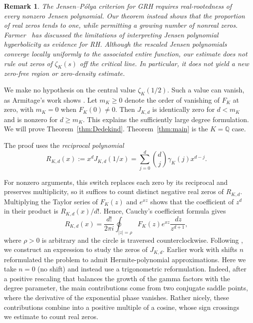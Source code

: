 \documentclass[11pt,reqno]{amsart}
\numberwithin{equation}{section}
\newtheorem{remark}[theorem]{Remark}
\newcommand{\dd}{\,d}
\begin{document}
\begin{remark}
    The Jensen--P\'olya criterion for GRH requires real-rootedness
of every nonzero Jensen polynomial. Our theorem instead
shows that the proportion of real zeros tends to one,
while permitting a growing number of nonreal zeros.
Farmer~\cite{Farmer2022} has discussed the limitations
of interpreting Jensen polynomial hyperbolicity as
evidence for RH. Although the rescaled Jensen
polynomials converge locally uniformly to the
associated entire function, our estimate does not
rule out zeros of $\zeta_K(s)$ off the critical line.
In particular, it does not yield a new zero-free region
or zero-density estimate.
\end{remark}

We make no hypothesis on the central value $\zeta_K(1/2)$.
Such a value can vanish, as Armitage's work shows
\cite{Armitage}. Let $m_K\ge0$ denote the order of vanishing of
$F_K$ at zero, with $m_K=0$ when $F_K(0)\ne0$. Then $J_{K,d}$
is identically zero for $d<m_K$ and is nonzero for
$d\ge m_K$. This explains the sufficiently large degree formulation.
We will prove Theorem~\ref{thm:Dedekind}. Theorem~\ref{thm:main} is the $K=\mathbb{Q}$ case.

The proof uses the \emph{reciprocal polynomial}
\begin{equation}\label{eq:reciprocal-definition}
 R_{K,d}(x):=x^dJ_{K,d}(1/x)
           =\sum_{j=0}^d\binom dj\gamma_K(j)x^{d-j}.
\end{equation}

For nonzero arguments, this switch replaces each zero by its
reciprocal and preserves multiplicity, so it suffices to count
distinct negative real zeros of $R_{K,d}$. Multiplying the Taylor
series of $F_K(z)$ and $e^{xz}$ shows that the coefficient of $z^d$
in their product is $R_{K,d}(x)/d!$. Hence, Cauchy's coefficient formula
gives
\[
 R_{K,d}(x)=\frac{d!}{2\pi i}
       \oint_{|z|=\rho}F_K(z)e^{xz}\frac{\dd z}{z^{d+1}},
\]
where $\rho>0$ is arbitrary and the circle is traversed
counterclockwise. Following \cite{GORZ, GORTTW, Wagner}, we construct an expression to study the zeros of $J_{K,d}$. Earlier work with shifts $n$ reformulated the problem to admit Hermite-polynomial approximations. Here we take $n=0$ (no shift) and instead use a trigonometric reformulation.
Indeed, after a positive rescaling that balances the
growth of the gamma factors with the degree parameter, the main
contributions come from two conjugate saddle points, where the
derivative of the exponential phase vanishes. Rather nicely, these contributions
combine into a positive multiple of a cosine, whose sign crossings we estimate to count real zeros.
\end{document}
